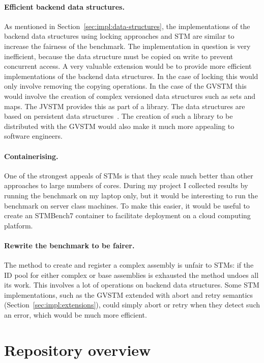 \documentclass[12pt,a4paper,oneside,openright]{report}
\begin{document}
\paragraph{Efficient backend data structures.} As mentioned in
Section~\ref{sec:impl:data-structures}, the implementations of the
backend data structures using locking approaches and STM are similar
to increase the fairness of the benchmark. The implementation in
question is very inefficient, because the data structure must be
copied on write to prevent concurrent access. A very valuable
extension would be to provide more efficient implementations of the
backend data structures. In the case of locking this would only
involve removing the copying operations. In the case of the GVSTM this
would involve the creation of complex versioned data structures such
as sets and maps. The JVSTM provides this as part of a library. The
data structures are based on persistent data
structures~\cite{PurelyFunctional}. The creation of such a library to
be distributed with the GVSTM would also make it much more appealing
to software engineers.

\paragraph{Containerising.} One of the strongest appeals of STMs is
that they scale much better than other approaches to large numbers of
cores. During my project I collected results by running the benchmark
on my laptop only, but it would be interesting to run the benchmark on
server class machines. To make this easier, it would be useful to
create an STMBench7 container to facilitate deployment on a cloud
computing platform.

\paragraph{Rewrite the benchmark to be fairer.} The method to create
and register a complex assembly is unfair to STMs: if the ID pool for
either complex or base assemblies is exhausted the method undoes all
its work. This involves a lot of operations on backend data
structures. Some STM implementations, such as the GVSTM extended with
abort and retry semantics (Section~\ref{sec:impl:extensions}), could
simply abort or retry when they detect such an error, which would be
much more efficient.

\section{Repository overview}
\label{sec:impl:repository-overview}
\end{document}

